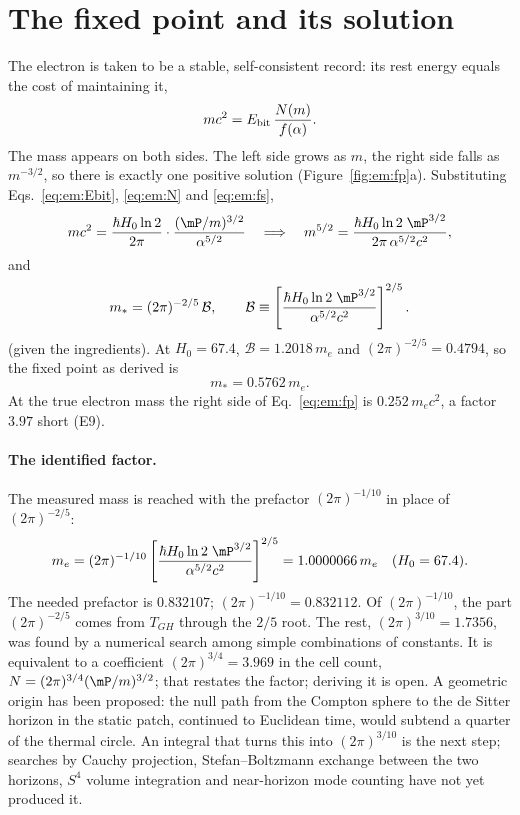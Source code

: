 \section{The fixed point and its solution}\label{sec:em:fixed}
The electron is taken to be a stable, self-consistent record: its rest energy equals the cost of maintaining it,
\begin{equation}
mc^2=E_{\rm bit}\,\frac{N(m)}{f(\alpha)}.\label{eq:em:fp}
\end{equation}
\conjecture{} The mass appears on both sides. The left side grows as $m$, the right side falls as $m^{-3/2}$, so there is exactly one positive
solution (Figure~\ref{fig:em:fp}a). \derived{} Substituting Eqs.~\eqref{eq:em:Ebit}, \eqref{eq:em:N} and \eqref{eq:em:fs},
\begin{equation}
mc^2=\frac{\hbar H_0\ln2}{2\pi}\cdot\frac{(\mP/m)^{3/2}}{\alpha^{5/2}}\quad\Longrightarrow\quad
m^{5/2}=\frac{\hbar H_0\ln2\;\mP^{3/2}}{2\pi\,\alpha^{5/2}c^2},\label{eq:em:m52}
\end{equation}
and
\begin{equation}
m_*=(2\pi)^{-2/5}\,\mathcal B,\qquad\mathcal B\equiv\left[\frac{\hbar H_0\ln2\;\mP^{3/2}}{\alpha^{5/2}c^2}\right]^{2/5}.\label{eq:em:mstar}
\end{equation}
\derived{} (given the ingredients). At $H_0=67.4$, $\mathcal B=1.2018\,m_e$ and $(2\pi)^{-2/5}=0.4794$, so the fixed point as derived is
\begin{equation}
m_*=0.5762\,m_e.\label{eq:em:short}
\end{equation}
\calc{} At the true electron mass the right side of Eq.~\eqref{eq:em:fp} is $0.252\,m_ec^2$, a factor $3.97$ short (E9). \calc

\paragraph{The identified factor.} The measured mass is reached with the prefactor $(2\pi)^{-1/10}$ in place of $(2\pi)^{-2/5}$:
\begin{equation}
m_e=(2\pi)^{-1/10}\left[\frac{\hbar H_0\ln2\;\mP^{3/2}}{\alpha^{5/2}c^2}\right]^{2/5}=1.0000066\,m_e\quad(H_0=67.4).\label{eq:em:result}
\end{equation}
The needed prefactor is $0.832107$; $(2\pi)^{-1/10}=0.832112$. \calc{} Of $(2\pi)^{-1/10}$, the part $(2\pi)^{-2/5}$ comes from $T_{GH}$ through
the $2/5$ root. The rest, $(2\pi)^{3/10}=1.7356$, was found by a numerical search among simple combinations of constants. \fitted{} It is
equivalent to a coefficient $(2\pi)^{3/4}=3.969$ in the cell count, $N=(2\pi)^{3/4}(\mP/m)^{3/2}$; that restates the factor; deriving it is open. \calc{} A geometric origin has been proposed: the null path from the Compton sphere to the de Sitter horizon in the static patch, continued to
Euclidean time, would subtend a quarter of the thermal circle. An integral that turns this into $(2\pi)^{3/10}$ is the next step; searches by Cauchy projection, Stefan--Boltzmann exchange between the two horizons, $S^4$ volume integration and near-horizon mode counting have not yet produced it. \openprob

